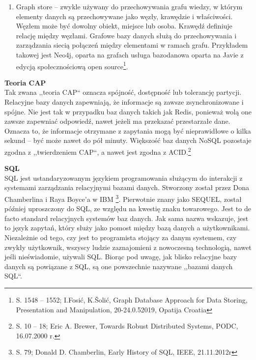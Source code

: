 \documentclass[12pt, a4paper, twoside, openany]{book}
\newcommand{\forceindent}{\leavevmode{\parindent=1.3em\indent}}
\begin{document}
\begin{enumerate}[label=--]
          Z kolei Apache Cassandra została zaprojektowana do zarządzania dużymi ilościami danych na wielu serwerach i w klastrach obejmujących wiele centrów danych.
          Jest ona wykorzystywana w różnych przypadkach, takich jak serwisy społecznościowe i analiza danych w czasie rzeczywistym\footnote{S. 118 -- 122; K. T. Sridhar, Modern Column Stores for Big Data Processing, XtremeData Technologies, Bangalore, India, 25.11.2017 r.}.
    \item Graph store -- zwykle używany do przechowywania grafu wiedzy, w którym elementy danych są przechowywane jako węzły, krawędzie i właściwości.
          Węzłem może być dowolny obiekt, miejsce lub osoba.
          Krawędź definiuje relację między węzłami.
          Grafowe bazy danych służą do przechowywania i zarządzania siecią połączeń między elementami w ramach grafu.
          Przykładem takowej jest Neo4j, oparta na grafach usługa bazodanowa oparta na Javie z edycją społecznościową open source\footnote{S. 1548 -- 1552; I.Fosić, K.Šolić, Graph Database Approach for Data Storing, Presentation and Manipulation, 20-24.0.52019, Opatija Croatia}.
\end{enumerate}

\textbf{Teoria CAP} \\
\forceindent Tak zwana ,,teoria CAP`` oznacza spójność, dostępność lub tolerancję partycji. Relacyjne bazy danych zapewniają, że informacje są zawsze zsynchronizowane i spójne. Nie jest tak w przypadku baz danych takich jak Redis, ponieważ wolą one zawsze zapewniać odpowiedź, nawet jeżeli ma przekazać przestarzałe dane. Oznacza to, że informacje otrzymane z zapytania mogą być nieprawidłowe o kilka sekund -- być może nawet do pół minuty. Większość baz danych NoSQL pozostaje zgodna z ,,twierdzeniem CAP``, a nawet jest zgodna z ACID.\footnote{S. 10 -- 18; Eric A. Brewer, Towards Robust Distributed Systems, PODC, 16.07.2000 r.}

\textbf{SQL\\}
\forceindent SQL jest ustandaryzowanym językiem programowania służącym do interakcji z systemami zarządzania relacyjnymi bazami danych. Stworzony został przez Dona Chamberlina i Raya Boyce'a w IBM \footnote{S. 79; Donald D. Chamberlin, Early History of SQL, IEEE, 21.11.2012r}.
Pierwotnie znany jako SEQUEL, został później uproszczony do SQL, ze względu na kwestię znaku towarowego.
Jest to de facto standard relacyjnych systemów baz danych.
Jak sama nazwa wskazuje, jest to język zapytań, który służy jako pomost między bazą danych a użytkownikami.
Niezależnie od tego, czy jest to programista stojący za danym systemem, czy zwykły użytkownik, wszyscy ludzie zaznajomieni z nowoczesną technologią, nawet jeśli nieświadomie, używali SQL.
Biorąc pod uwagę, jak blisko relacyjne bazy danych są powiązane z SQL, są one powszechnie nazywane ,,bazami danych SQL``.
\end{document}
